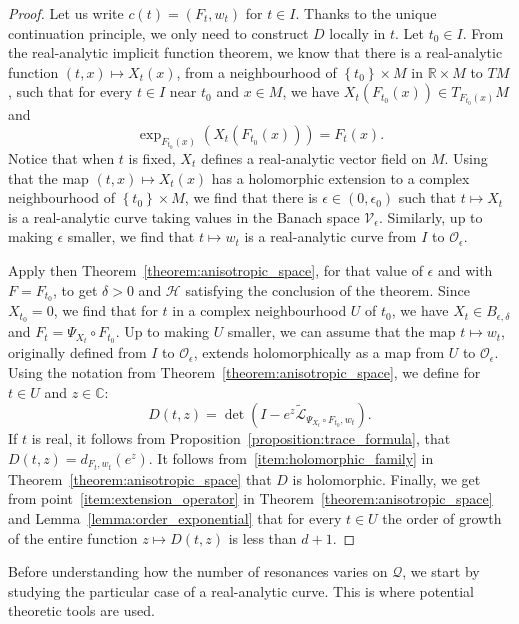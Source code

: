 \documentclass[AHL,Unicode,longabstracts,published]{cedram}
\newcommand{\set}[1]{\left\{ #1 \right\}}
\newcommand{\p}[1]{\left(#1\right)}
\newcommand{\clO}{\mathcal{O}}
\newcommand{\clL}{\mathcal{L}}
\newcommand{\clH}{\mathcal{H}}
\newcommand{\clV}{\mathcal{V}}
\newcommand{\clQ}{\mathcal{Q}}
\newcommand{\bbC}{\mathbb{C}}
\newcommand{\bbR}{\mathbb{R}}
\newcommand{\clO}{\mathcal{O}}
\begin{document}
\begin{proof}
Let us write $c(t) = (F_t,w_t)$ for $t \in I$. Thanks to the unique continuation principle, we only need to construct $D$ locally in $t$. Let $t_0 \in I$. From the real-analytic implicit function theorem, we know that there is a real-analytic function $(t,x) \mapsto X_t(x)$, from a neighbourhood of $\set{t_0} \times M$ in $\bbR \times M$ to $TM$, such that for every $t \in I$ near $t_0$ and $x \in M$, we have $X_t(F_{t_0}(x)) \in T_{F_{t_0}(x)} M$ and
\begin{equation*}
\exp_{F_{t_0}(x)}\p{X_t(F_{t_0}(x))} = F_t(x).
\end{equation*}
Notice that when $t$ is fixed, $X_t$ defines a real-analytic vector field on $M$. Using that the map $(t,x) \mapsto X_t(x)$ has a holomorphic extension to a complex neighbourhood of $\set{t_0} \times M$, we find that there is $\epsilon \in (0,\epsilon_0)$ such that $t \mapsto X_t$ is a real-analytic curve taking values in the Banach space $\clV_\epsilon$. Similarly, up to making $\epsilon$ smaller, we find that $t \mapsto w_t$ is a real-analytic curve from $I$ to $\clO_\epsilon$.

Apply then Theorem~\ref{theorem:anisotropic_space}, for that value of $\epsilon$ and with $F = F_{t_0}$, to get $\delta > 0$ and $\clH$ satisfying the conclusion of the theorem. Since $X_{t_0} = 0$, we find that for $t$ in a complex neighbourhood $U$ of $t_0$, we have $X_t \in B_{\epsilon,\delta}$ and $F_t = \Psi_{X_t} \circ F_{t_0}$. Up to making $U$ smaller, we can assume that the map $t \mapsto w_t$, originally defined from $I$ to $\clO_\epsilon$, extends holomorphically as a map from $U$ to $\clO_\epsilon$. Using the notation from Theorem~\ref{theorem:anisotropic_space}, we define for $t \in U$ and $z \in \bbC$:
\begin{equation*}
D(t,z) = \det\p{ I - e^z \widetilde{\clL}_{\Psi_{X_t} \circ F_{t_0},w_t}}.
\end{equation*}
If $t$ is real, it follows from Proposition~\ref{proposition:trace_formula}, that $D(t,z) = d_{F_t,w_t}(e^z)$. It follows from~\eqref{item:holomorphic_family} in Theorem~\ref{theorem:anisotropic_space} that $D$ is holomorphic. Finally, we get from point~\eqref{item:extension_operator} in Theorem~\ref{theorem:anisotropic_space} and Lemma~\ref{lemma:order_exponential} that for every $t \in U$ the order of growth of the entire function $z \mapsto D(t,z)$ is less than $d+1$.
\end{proof}

Before understanding how the number of resonances varies on $\clQ$, we start by studying the particular case of a real-analytic curve. This is where potential theoretic tools are used.
\end{document}

